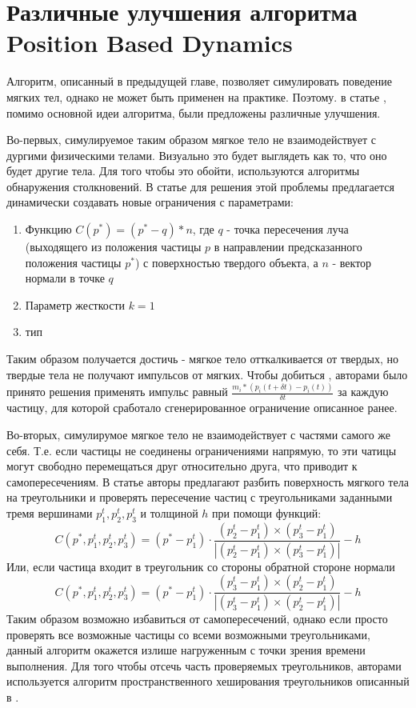 \section{Различные улучшения алгоритма Position Based Dynamics} \label{ch2:pbd-improvments} %
	Алгоритм, описанный в предыдущей главе, позволяет симулировать поведение мягких тел, однако не может быть применен на практике. Поэтому. в статье \cite{pbd}, помимо основной идеи алгоритма, были предложены различные улучшения.
	
	Во-первых, симулируемое таким образом мягкое тело не взаимодействует с дургими физическими телами. Визуально это будет выглядеть как то, что оно будет  другие тела. Для того чтобы это обойти, используются алгоритмы обнаружения столкновений. В статье \cite{pbd} для решения этой проблемы предлагается динамически создавать новые ограничения с параметрами:
	\begin{enumerate}[1.]
		\item Функцию $C(p^*) = (p^* - q) * n$, где $q$ - точка пересечения луча (выходящего из положения частицы $p$ в направлении предсказанного положения частицы $p^*$) с поверхностью твердого объекта, а $n$ - вектор нормали в точке $q$
		\item Параметр жесткости $k = 1$
		\item тип 
	\end{enumerate}
	Таким образом получается достичь  - мягкое тело отткалкивается от твердых, но твердые тела не получают импульсов от мягких. Чтобы добиться , авторами было принято решения применять импульс равный $\frac{m_i*(p_i(t + \delta t) - p_i(t))}{\delta t}$ за каждую частицу, для которой сработало сгенерированное ограничение описанное ранее.
		
	Во-вторых, симулирумое мягкое тело не взаимодействует с частями самого же себя. Т.е. если частицы не соединены ограничениями напрямую, то эти чатицы могут свободно перемещаться друг относительно друга, что приводит к самопересечениям. В статье \cite{pbd} авторы предлагают разбить поверхность мягкого тела на треугольники и проверять пересечение частиц с треугольниками заданными тремя вершинами $p_1^t, p_2^t, p_3^t$ и толщиной $h$ при помощи функций:
	\begin{equation}
		C(p^*, p_1^t, p_2^t, p_3^t) = (p^* - p_1^t) \cdot \frac{(p_2^t - p_1^t) \times (p_3^t - p_1^t)}{|(p_2^t - p_1^t) \times (p_3^t - p_1^t)|} - h
	\end{equation}
	Или, если частица входит в треугольник со стороны обратной стороне нормали
	\begin{equation}
		C(p^*, p_1^t, p_2^t, p_3^t) = (p^* - p_1^t) \cdot \frac{(p_3^t - p_1^t) \times (p_2^t - p_1^t)}{|(p_3^t - p_1^t) \times (p_2^t - p_1^t)|} - h
	\end{equation}	
	Таким образом возможно избавиться от самопересечений, однако если просто проверять все возможные частицы со всеми возможными треугольниками, данный алгоритм окажется излише нагруженным с точки зрения времени выполнения. Для того чтобы отсечь часть проверяемых треугольников, авторами используется алгоритм пространственного хеширования треугольников описанный в \cite{teschner2003optimized}.
	
